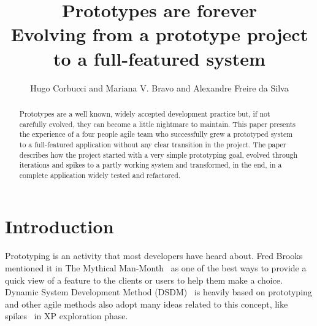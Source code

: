 \documentclass[lnbip]{svmultln}
\begin{document}
%
\mainmatter %
%
\title{Prototypes are forever\\
  Evolving from a prototype project\\ to a full-featured system}
%
%
\author{Hugo Corbucci and Mariana V. Bravo  and
  Alexandre Freire da Silva}
%
%
%

\maketitle %

\begin{abstract} %
  Prototypes are a well known, widely accepted development practice
  but, if not carefully evolved, they can become a little nightmare to
  maintain. This paper presents the experience of a four people agile
  team who successfully grew a prototyped system to a
  full-featured application without any clear transition in the
  project. The paper describes how the project started with a very
  simple prototyping goal, evolved through iterations and spikes to a
  partly working system and transformed, in the end, in a complete
  application widely tested and refactored.

\end{abstract}
%
\section{Introduction}

Prototyping is an activity that most developers have heard about. Fred
Brooks mentioned it in The Mythical Man-Month~\cite{Brooks1975} as one
of the best ways to provide a quick view of a feature to the clients
or users to help them make a choice. Dynamic System Development Method
(DSDM)~\cite{DSDM} is heavily based on prototyping and other agile
methods also adopt many ideas related to this concept, like
spikes~\cite{XP} in XP exploration phase.
\end{document}
